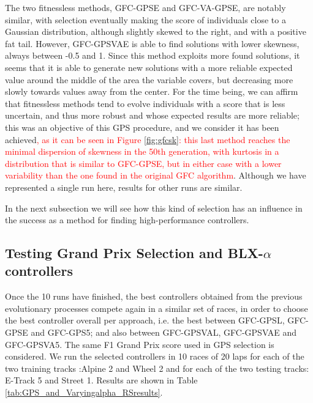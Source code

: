 \documentclass[10pt,journal,compsoc]{IEEEtran}
\begin{document}
The two fitnessless methods, {\sf GFC-GPSE} and {\sf GFC-VA-GPSE}, are
notably similar, with selection eventually making the score of
individuals close to a Gaussian distribution, although slightly skewed
to the right, and with a positive fat tail. However, {\sf GFC-GPSVAE}
is able to find solutions with lower skewness, always between -0.5 and
1. Since this method exploits more found solutions, it seems that it
is able to generate new solutions with a more reliable expected value
around the middle of the area the variable covers, but decreasing more
slowly towards values away from the center. For the time being, we can
affirm that fitnessless methods tend to evolve individuals with a
score that is less uncertain, and thus more robust and whose expected
results are more reliable; this was an objective of this GPS
procedure, and we consider it has been achieved\textcolor{red}{, as it can be seen in
Figure \ref{fig:gfcsk}: this last method reaches the minimal
dispersion of skewness in the 50th generation, with kurtosis in a
distribution that is similar to {\sf GFC-GPSE}, but in either case
with a lower variability than the one found in the original {\sf GFC} algorithm}. Although we have
represented a single run here, results for other runs are similar.

In the next subsection we will see how this kind of selection has an influence in the success as a method for finding high-performance controllers.



\subsection{Testing Grand Prix Selection and BLX-$\alpha$ controllers}

Once the 10 runs have finished, the best controllers obtained from the
previous evolutionary processes compete again in a similar set of
races, in order to choose the best controller overall per approach,
i.e. the best between {\sf GFC-GPSL}, {\sf GFC-GPSE} and {\sf
  GFC-GPS5}; and also between {\sf GFC-GPSVAL}, {\sf GFC-GPSVAE} and
{\sf GFC-GPSVA5}. The same F1 Grand Prix score used in GPS selection
is considered. We run the selected controllers in 10 races of 20 laps
for each of the two training tracks :Alpine 2  and Wheel 2  and  for
each of the two testing tracks: E-Track 5 and Street 1. Results are
shown in Table \ref{tab:GPS_and_Varyingalpha_RSresults}.
\end{document}
